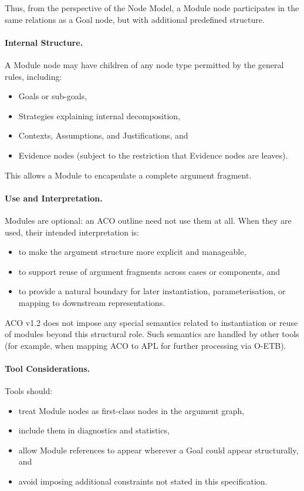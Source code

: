 \documentclass[11pt,twoside,a4paper]{article}
\begin{document}
Thus, from the perspective of the Node Model, a Module node participates in the same
relations as a Goal node, but with additional predefined structure.

\paragraph{Internal Structure.}
A Module node may have children of any node type permitted by the general rules,
including:
\begin{itemize}[leftmargin=2em]
  \item Goals or sub-goals,
  \item Strategies explaining internal decomposition,
  \item Contexts, Assumptions, and Justifications, and
  \item Evidence nodes (subject to the restriction that Evidence nodes are leaves).
\end{itemize}

This allows a Module to encapsulate a complete argument fragment.

\paragraph{Use and Interpretation.}
Modules are optional: an ACO outline need not use them at all. When they are used,
their intended interpretation is:
\begin{itemize}[leftmargin=2em]
  \item to make the argument structure more explicit and manageable,
  \item to support reuse of argument fragments across cases or components, and
  \item to provide a natural boundary for later instantiation, parameterisation,
        or mapping to downstream representations.
\end{itemize}

ACO v1.2 does not impose any special semantics related to instantiation or reuse of modules
beyond this structural role. Such semantics are handled by other tools (for example,
when mapping ACO to APL for further processing via O-ETB).

\paragraph{Tool Considerations.}
Tools should:
\begin{itemize}[leftmargin=2em]
  \item treat Module nodes as first-class nodes in the argument graph,
  \item include them in diagnostics and statistics,
  \item allow Module references to appear wherever a Goal could appear structurally, and
  \item avoid imposing additional constraints not stated in this specification.
\end{itemize}
\end{document}
